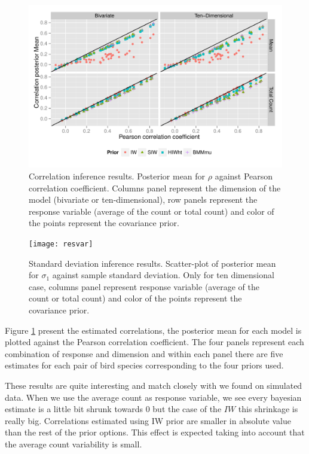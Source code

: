 \documentclass{article}
\begin{document}
\begin{figure}[hbpt]
\centering
\includegraphics[width=\textwidth]{rescorr}
 \vspace{-.5in}
\caption{Correlation inference results. Posterior mean for $\rho$  against Pearson correlation coefficient. 
Columns panel represent the dimension of the model (bivariate or ten-dimensional), row panels represent the response variable (average of the count or total count)  and color of the points represent the covariance prior. \label{fig:coring}  }
\end{figure}

\begin{figure}[hbpt]
\centering
\texttt{[image: resvar]}
 \vspace{-.5in}
\caption{Standard deviation inference results. Scatter-plot of posterior mean for $\sigma_1$  against sample standard deviation. Only for ten dimensional case, columns panel represent response variable (average of the count or total count)  and color of the points represent the covariance prior. \label{birdsd}  }
\end{figure}

Figure \ref{fig:coring} present the estimated correlations, the posterior mean for each model is plotted against the Pearson correlation coefficient. The four panels represent each combination of response and dimension and within each panel there are five estimates for each pair of bird species corresponding to the four priors used. 

These results are quite interesting and match closely with we found on simulated data. When we use the average count as response variable, we see every bayesian estimate is a little bit shrunk towards 0 but the case of the $IW$ this shrinkage is really big. Correlations estimated using IW prior are smaller in absolute value than the rest of the prior options. This effect is expected taking into account that the average count variability is small. 
\end{document}
